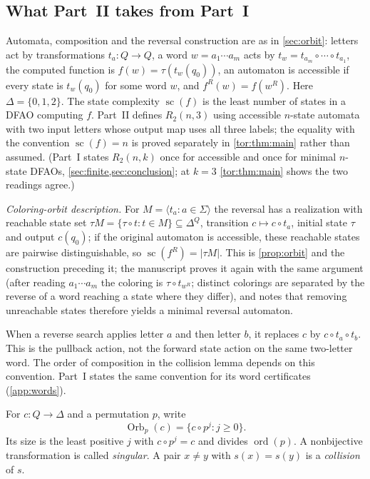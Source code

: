 \documentclass[11pt,a4paper]{article}
\numberwithin{equation}{section}
\theoremstyle{definition}
\theoremstyle{remark}
\newcommand{\D}{\Delta}
\newcommand{\ord}{\operatorname{ord}}
\newcommand{\statecomplex}{\operatorname{sc}}
\newcommand{\Orb}{\operatorname{Orb}}
\begin{document}
\subsection{What Part~II takes from Part~I}\label{tor:sec:imported}

Automata, composition and the reversal construction are as in
\cref{sec:orbit}: letters act by transformations $t_a:Q\to Q$, a word
$w=a_1\cdots a_m$ acts by $t_w=t_{a_m}\circ\cdots\circ t_{a_1}$, the computed
function is $f(w)=\tau(t_w(q_0))$, an automaton is accessible if every state
is $t_w(q_0)$ for some word $w$, and $f^R(w)=f(w^R)$. Here
$\D=\{0,1,2\}$. The state complexity $\statecomplex(f)$ is the least number
of states in a DFAO computing $f$. Part~II defines $R_2(n,3)$ using accessible
$n$-state automata with two input letters whose output map uses all three
labels; the equality with the convention $\statecomplex(f)=n$ is proved
separately in \cref{tor:thm:main} rather than assumed. (Part~I states
$R_2(n,k)$ once for accessible and once for minimal $n$-state DFAOs,
\cref{sec:finite,sec:conclusion}; at $k=3$ \cref{tor:thm:main} shows the two
readings agree.)

\emph{Coloring-orbit description.} For $M=\langle t_a:a\in\Sigma\rangle$ the
reversal has a realization with reachable state set
$\tau M=\{\tau\circ t:t\in M\}\subseteq\D^Q$, transition
$c\mapsto c\circ t_a$, initial state $\tau$ and output $c(q_0)$; if the
original automaton is accessible, these reachable states are pairwise
distinguishable, so $\statecomplex(f^R)=|\tau M|$. This is \cref{prop:orbit}
and the construction preceding it; the manuscript proves it again with the
same argument (after reading $a_1\cdots a_m$ the coloring is
$\tau\circ t_{w^R}$; distinct colorings are separated by the reverse of a word
reaching a state where they differ), and notes that removing unreachable
states therefore yields a minimal reversal automaton.

\begin{remark}\label{tor:rem:word}
When a reverse search applies letter $a$ and then letter $b$, it replaces
$c$ by $c\circ t_a\circ t_b$. This is the pullback action, not the forward
state action on the same two-letter word. The order of composition in the
collision lemma depends on this convention. Part~I states the same
convention for its word certificates (\cref{app:words}).
\end{remark}

For $c:Q\to\D$ and a permutation $p$, write
\[
 \Orb_p(c)=\{c\circ p^j:j\ge0\}.
\]
Its size is the least positive $j$ with $c\circ p^j=c$ and divides
$\ord(p)$. A nonbijective transformation is called \emph{singular}. A pair
$x\ne y$ with $s(x)=s(y)$ is a \emph{collision} of $s$.
\end{document}
